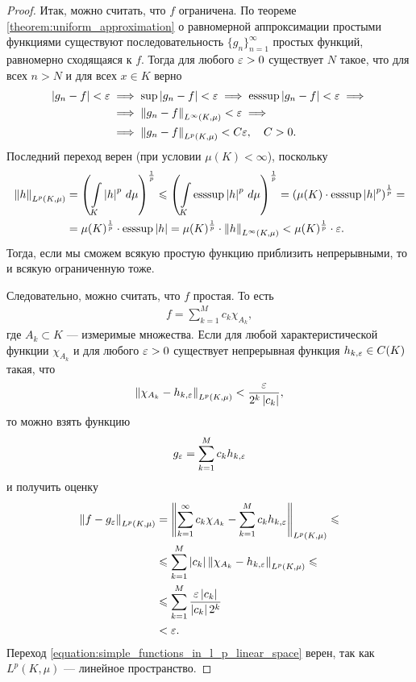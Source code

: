 \begin{proof}
 Итак, можно считать, что $f$ ограничена. По теореме \ref{theorem:uniform_approximation} о равномерной аппроксимации простыми функциями существуют последовательность $\{g_{n}\}_{n=1}^{\infty} $ простых функций, равномерно сходящаяся к $f$. Тогда для любого $\varepsilon > 0$ существует $N$ такое, что для всех $n > N$ и для всех $x \in K$ верно \begin{align*}
  \left| g_n - f \right| < \varepsilon &\implies \sup \left| g_n - f \right| < \varepsilon \implies \mathrm{ess sup} \left| g_n - f \right| < \varepsilon \implies \\ &\implies \left\| g_n - f \right\|_{L^{\infty}(K, \mu)} < \varepsilon \implies \\ &\implies \left\| g_n - f \right\|_{L^{p}(K, \mu)} < C\varepsilon, \quad C > 0
 .\end{align*}  Последний переход верен (при условии $\mu(K) < \infty$), поскольку \begin{align*}
 \left\| h \right\|_{L^{p}(K,\mu)} &= \left( \int\limits_{K} \left| h \right|^{p} \, d\mu   \right)^{\frac{1}{p}} \leqslant \left( \int\limits_{K} \mathrm{esssup} \left| h \right|^{p} \, d\mu   \right)^{\frac{1}{p}} = \left( \mu(K) \cdot \mathrm{ess sup} \left| h \right|^{p} \right)^{\frac{1}{p}} = \\
 &=\mu(K)^{\frac{1}{p}} \cdot \mathrm{ess sup} \left| h \right| = \mu(K)^{\frac{1}{p}} \cdot \left\| h \right\|_{L^{\infty}(K,\mu)} < \mu(K)^{\frac{1}{p}} \cdot \varepsilon
 .\end{align*} Тогда, если мы сможем всякую простую функцию приблизить непрерывными, то и всякую ограниченную тоже.

 Следовательно, можно считать, что $f$ простая. То есть \begin{align*}
 f = \sum_{k=1}^{M}  c_k \chi_{A_k}
 ,\end{align*} где $A_k \subset K$ --- измеримые множества. Если для любой характеристической функции $\chi_{A_k}$ и для любого $\varepsilon > 0$ существует непрерывная функция $h_{k,\varepsilon} \in C(K)$ такая, что  \begin{align*}
\left\| \chi_{A_k} - h_{k,\varepsilon} \right\|_{L^{p}(K,\mu)} < \frac{\varepsilon}{2^{k}\left| c_k \right|}
,\end{align*} то можно взять функцию \begin{align*}
g_{\varepsilon} = \sum_{k=1}^{M} c_k h_{k,\varepsilon}
\end{align*} и получить оценку \begin{align}
\label{equation:simple_functions_in_l_p_linear_space}
\left\| f - g_{\varepsilon} \right\|_{L^{p}(K,\mu)} &= \left\| \sum_{k=1}^{\infty} c_k \chi_{A_k} - \sum_{k=1}^{M} c_k h_{k,\varepsilon} \right\|_{L^{p}(K,\mu)} \leqslant \\
\nonumber &\leqslant \sum_{k=1}^{M} \left| c_k \right| \left\| \chi_{A_k} - h_{k,\varepsilon} \right\|_{L^{p}(K,\mu)} \leqslant \\
\nonumber
 & \leqslant \sum_{k=1}^{M}  \frac{\varepsilon \left| c_k \right|}{\left| c_k \right| 2^{k}} \\
 \nonumber
 &< \varepsilon
.\end{align} Переход \eqref{equation:simple_functions_in_l_p_linear_space} верен, так как $L^{p}(K,\mu)$ --- линейное пространство.


\end{proof}
